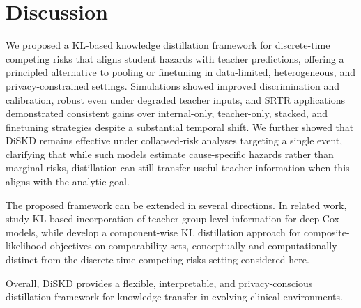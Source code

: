 \documentclass{article}
\theoremstyle{plain}
\theoremstyle{definition}
\theoremstyle{remark}
\begin{document}
\section{Discussion}
We proposed a KL-based knowledge distillation framework for discrete-time competing risks that aligns student hazards with teacher predictions, offering a principled alternative to pooling or finetuning in data-limited, heterogeneous, and privacy-constrained settings. Simulations showed improved discrimination and calibration, robust even under degraded teacher inputs, and SRTR applications demonstrated consistent gains over internal-only, teacher-only, stacked, and finetuning strategies despite a substantial temporal shift. We further showed that DiSKD remains effective under collapsed-risk analyses targeting a single event, clarifying that while such models estimate cause-specific hazards rather than marginal risks, distillation can still transfer useful teacher information when this aligns with the analytic goal.


The proposed framework can be extended in several directions. In related work, \citet{ConcurrentWork1} study KL-based incorporation of teacher group-level information for deep Cox models, while \citet{ConcurrentWork2} develop a component-wise KL distillation approach for composite-likelihood objectives on comparability sets, conceptually and computationally distinct from the discrete-time competing-risks setting considered here.

Overall, DiSKD provides a flexible, interpretable, and privacy-conscious distillation framework for knowledge transfer in evolving clinical environments.



\end{document}

